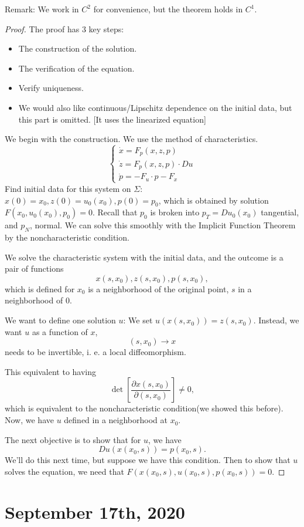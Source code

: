 \documentclass[12pt]{scrartcl}
\begin{document}
Remark: We work in $C^2$ for convenience, but the theorem holds in $C^1$.
\begin{proof}
The proof has 3 key steps:
\begin{itemize}
\item The construction of the solution.
\item The verification of the equation.
\item Verify uniqueness.
\item We would also like continuous/Lipschitz dependence on the initial data, but this part is omitted.  [It uses the linearized equation]
\end{itemize}
We begin with the construction.  We use the method of characteristics.  
$$\begin{cases}
\dot{x} = F_p(x, z, p)\\
\dot z = F_p(x, z, p) \cdot Du\\
\dot p = - F_u \cdot p - F_x
\end{cases}
$$
Find initial data for this system on $\Sigma:$ $x(0) = x_0, z(0) = u_0(x_0), p(0) = p_0$, which is obtained by solution $F(x_0, u_0(x_0), p_0) = 0$.  Recall that $p_0$ is broken into $p_T = Du_0(x_0)$ tangential, and $p_N$, normal.  We can solve this smoothly with the Implicit Function Theorem by the noncharacteristic condition.  

We solve the characteristic system with the initial data, and the outcome is a pair of functions 
$$x(s, x_0), z(s, x_0), p(s, x_0),$$
which is defined for $x_0$ is a neighborhood of the original point, $s$ in a neighborhood of $0$.

We want to define one solution $u$: We set $u(x(s, x_0)) = z(s, x_0)$.  Instead, we want $u$ as a function of $x$,
$$(s, x_0) \rightarrow x$$ needs to be invertible, i. e. a local diffeomorphism.

This equivalent to having 
$$\det \left [\frac{\partial x(s, x_0)}{\partial (s, x_0)}\right ] \ne 0,$$
which is equivalent to the noncharacteristic condition(we showed this before).  Now, we have $u$ defined in a neighborhood at $x_0$.

The next objective is to show that for $u$, we have
$$\boxed{Du(x(x_0, s)) = p(x_0, s)}.$$
We'll do this next time, but suppose we have this condition.  Then to show that $u$ solves the equation, we need that $F(x(x_0, s), u(x_0, s), p(x_0, s)) = 0$.
\end{proof}
\pagebreak
\section{September 17th, 2020}
\end{document}
